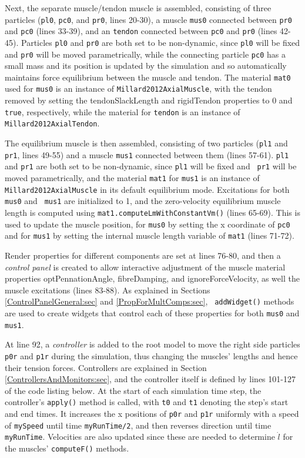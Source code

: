 Next, the separate muscle/tendon muscle is assembled, consisting of
three particles ({\tt pl0}, {\tt pc0}, and {\tt pr0}, lines 20-30), a
muscle {\tt mus0} connected between {\tt pr0} and {\tt pc0} (lines
33-39), and an {\tt tendon} connected between {\tt pc0} and {\tt pr0}
(lines 42-45). Particles {\tt pl0} and {\tt pr0} are both set to be
non-dynamic, since {\tt pl0} will be fixed and {\tt pr0} will be moved
parametrically, while the connecting particle {\tt pc0} has a small
mass and its position is updated by the simulation and so
automatically maintains force equilibrium between the muscle and
tendon. The material {\tt mat0} used for {\tt mus0} is an instance of
{\tt Millard2012AxialMuscle}, with the tendon removed by setting the
{\sf tendonSlackLength} and {\sf rigidTendon} properties to $0$ and
{\tt true}, respectively, while the material for {\tt tendon} is an
instance of {\tt Millard2012AxialTendon}.

The equilibrium muscle is then assembled, consisting of two particles
({\tt pl1} and {\tt pr1}, lines 49-55) and a muscle {\tt mus1}
connected between them (lines 57-61).  {\tt pl1} and {\tt pr1} are
both set to be non-dynamic, since {\tt pl1} will be fixed and {\tt
pr1} will be moved parametrically, and the material {\tt mat1} for
{\tt mus1} is an instance of {\tt Millard2012AxialMuscle} in its
default equilibrium mode. Excitations for both {\tt mus0} and {\tt
mus1} are initialized to 1, and the zero-velocity equilibrium muscle
length is computed using {\tt mat1.computeLmWithConstantVm()} (lines
65-69). This is used to update the muscle position, for {\tt mus0} by
setting the x coordinate of {\tt pc0} and for {\tt mus1} by setting
the internal muscle length variable of {\tt mat1} (lines 71-72).

Render properties for different components are set at lines 76-80, and
then a {\it control panel} is created to allow interactive adjustment
of the muscle material properties {\sf optPennationAngle}, {\sf
fibreDamping}, and {\sf ignoreForceVelocity}, as well the muscle
excitations (lines 83-88). As explained in Sections
\ref{ControlPanelGeneral:sec} and \ref{PropForMultComps:sec}, {\tt
addWidget()} methods are used to create widgets that control each of
these properties for both {\tt mus0} and {\tt mus1}.

At line 92, a {\it controller} is added to the root model to move the
right side particles {\tt p0r} and {\tt p1r} during the simulation,
thus changing the muscles' lengths and hence their tension
forces. Controllers are explained in Section
\ref{ControllersAndMonitors:sec}, and the controller itself is defined
by lines 101-127 of the code listing below. At the start of each
simulation time step, the controller's {\tt apply()} method is called,
with {\tt t0} and {\tt t1} denoting the step's start and end times.
It increases the x positions of {\tt p0r} and {\tt p1r} uniformly with
a speed of {\tt mySpeed} until time {\tt myRunTime/2}, and then
reverses direction until time {\tt myRunTime}. Velocities are also
updated since these are needed to determine $\dot l$ for the muscles'
{\tt computeF()} methods.

